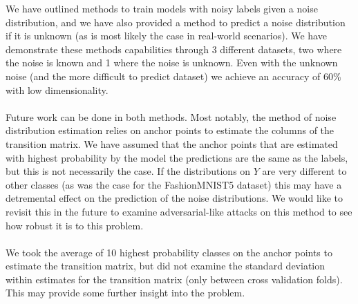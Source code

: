 \documentclass{article} %
\begin{document}
We have outlined methods to train models with noisy labels given a noise distribution, and we have also provided a method to predict a noise distribution if it is unknown (as is most likely the case in real-world scenarios). We have demonstrate these methods capabilities through 3 different datasets, two where the noise is known and 1 where the noise is unknown. Even with the unknown noise (and the more difficult to predict dataset) we achieve an accuracy of 60\% with low dimensionality.
\\\\
Future work can be done in both methods. Most notably, the method of noise distribution estimation relies on anchor points to estimate the columns of the transition matrix. We have assumed that the anchor points that are estimated with highest probability by the model the predictions are the same as the labels, but this is not necessarily the case. If the distributions on $Y$ are very different to other classes (as was the case for the FashionMNIST5 dataset) this may have a detremental effect on the prediction of the noise distributions. We would like to revisit this in the future to examine adversarial-like attacks on this method to see how robust it is to this problem.
\\\\
We took the average of 10 highest probability classes on the anchor points to estimate the transition matrix, but did not examine the standard deviation within estimates for the transition matrix (only between cross validation folds). This may provide some further insight into the problem.
\\\\
\end{document}
